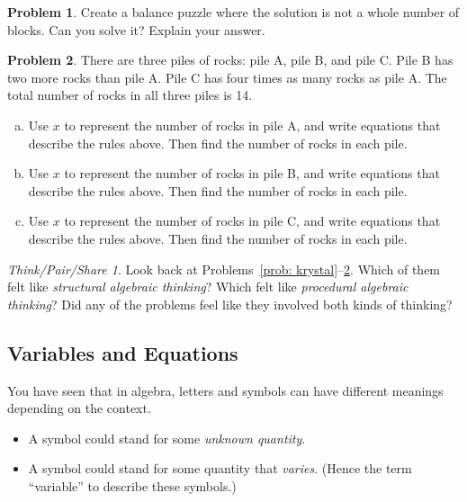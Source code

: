 \documentclass[12pt, reqno]{amsart}
\theoremstyle{remark}
\newtheorem*{thinkpair*}{Think/Pair/Share}
\theoremstyle{definition}
\newtheorem{problem}{Problem}
\numberwithin{equation}{section}  %
\begin{document}
\begin{problem}
Create a balance puzzle where the solution is not a whole number of blocks.  Can you solve it?  Explain your answer.
\end{problem}



\newpage


\begin{problem}\label{prob: rockpiles}
There are three piles of rocks: pile A, pile B, and pile C.  Pile B has two more rocks than pile A.  Pile C has four times as many rocks as pile A.  The total number of rocks in all three piles is 14.
\begin{enumerate}[(a)]
\item
Use $x$ to represent the number of rocks in pile A, and write equations that describe the rules above.  Then find the number of rocks in each pile.\\
\item
Use $x$ to represent the number of rocks in pile B, and write equations that describe the rules above.  Then find the number of rocks in each pile.\\
\item
Use $x$ to represent the number of rocks in pile C, and write equations that describe the rules above.  Then find the number of rocks in each pile.\\
\end{enumerate}
\end{problem}




\bigskip


\begin{thinkpair*}
Look back at Problems~\ref{prob: krystal}--\ref{prob: rockpiles}.  Which of them felt like \emph{structural algebraic thinking}?  Which felt like \emph{procedural algebraic thinking}?  Did any of the problems feel like they involved both kinds of thinking?

\end{thinkpair*}




\newpage

\subsection{Variables and Equations}
You have seen that in algebra,  letters and symbols  can have different meanings depending on the context.
\begin{itemize}
\item
A symbol could stand for some \emph{unknown quantity}.\\
\item
A symbol could stand for some quantity that \emph{varies}.  (Hence the term ``variable'' to describe these symbols.)\\
\end{itemize}
\end{document}
